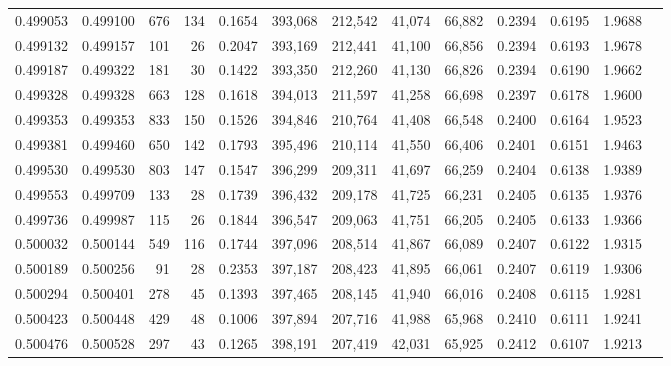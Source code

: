 \begin{tabular}{rrrrrrrrrrrrr}
0.499053 & 0.499100 &   676 &   134 &                                     0.1654 & 393,068 & 212,542 &  41,074 &  66,882 & 0.2394 & 0.6195 & 1.9688 \\
0.499132 & 0.499157 &   101 &    26 &                                     0.2047 & 393,169 & 212,441 &  41,100 &  66,856 & 0.2394 & 0.6193 & 1.9678 \\
0.499187 & 0.499322 &   181 &    30 &                                     0.1422 & 393,350 & 212,260 &  41,130 &  66,826 & 0.2394 & 0.6190 & 1.9662 \\
0.499328 & 0.499328 &   663 &   128 &                                     0.1618 & 394,013 & 211,597 &  41,258 &  66,698 & 0.2397 & 0.6178 & 1.9600 \\
0.499353 & 0.499353 &   833 &   150 &                                     0.1526 & 394,846 & 210,764 &  41,408 &  66,548 & 0.2400 & 0.6164 & 1.9523 \\
0.499381 & 0.499460 &   650 &   142 &                                     0.1793 & 395,496 & 210,114 &  41,550 &  66,406 & 0.2401 & 0.6151 & 1.9463 \\
0.499530 & 0.499530 &   803 &   147 &                                     0.1547 & 396,299 & 209,311 &  41,697 &  66,259 & 0.2404 & 0.6138 & 1.9389 \\
0.499553 & 0.499709 &   133 &    28 &                                     0.1739 & 396,432 & 209,178 &  41,725 &  66,231 & 0.2405 & 0.6135 & 1.9376 \\
0.499736 & 0.499987 &   115 &    26 &                                     0.1844 & 396,547 & 209,063 &  41,751 &  66,205 & 0.2405 & 0.6133 & 1.9366 \\
0.500032 & 0.500144 &   549 &   116 &                                     0.1744 & 397,096 & 208,514 &  41,867 &  66,089 & 0.2407 & 0.6122 & 1.9315 \\
0.500189 & 0.500256 &    91 &    28 &                                     0.2353 & 397,187 & 208,423 &  41,895 &  66,061 & 0.2407 & 0.6119 & 1.9306 \\
0.500294 & 0.500401 &   278 &    45 &                                     0.1393 & 397,465 & 208,145 &  41,940 &  66,016 & 0.2408 & 0.6115 & 1.9281 \\
0.500423 & 0.500448 &   429 &    48 &                                     0.1006 & 397,894 & 207,716 &  41,988 &  65,968 & 0.2410 & 0.6111 & 1.9241 \\
0.500476 & 0.500528 &   297 &    43 &                                     0.1265 & 398,191 & 207,419 &  42,031 &  65,925 & 0.2412 & 0.6107 & 1.9213 \\

\end{tabular}
